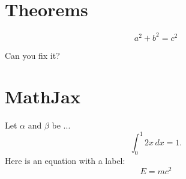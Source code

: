 \documentclass{camel}
\begin{document}
\chapter{Theorems}\label{ch:theorems}
\begin{theorem}
\[
a^2 + b^2 = c^2
\]
\end{theorem}

\begin{exercise}
Can you fix it?
\end{exercise}

\chapter{MathJax}\label{ch:mathjax}
Let $\alpha$ and $\beta$ be ...
\[
\int_0^1 2x\,dx = 1. 
\]
Here is an equation with a label:
\begin{equation}\label{eq:einstein}
E = mc^2
\end{equation}

\end{document}
